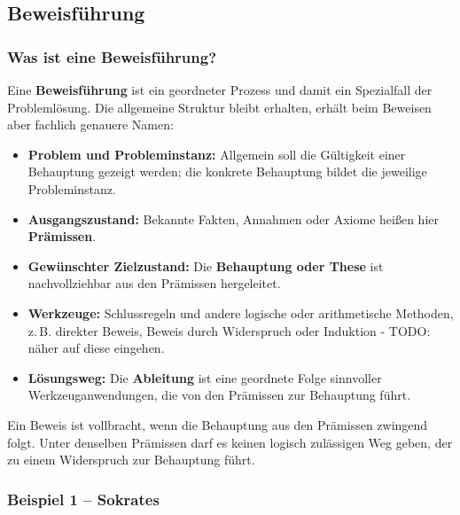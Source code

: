 \documentclass{article}
\begin{document}
  
  
    
      \subsection{Beweisführung}
    
      \subsubsection{Was ist eine Beweisführung?}
      

        Eine \textbf{Beweisführung} ist ein geordneter Prozess und damit ein Spezialfall der Problemlösung. Die allgemeine Struktur bleibt erhalten, erhält beim Beweisen aber fachlich genauere Namen:
      

      \begin{itemize}
        \item \textbf{Problem und Probleminstanz:} Allgemein soll die Gültigkeit einer Behauptung gezeigt werden; die konkrete Behauptung bildet die jeweilige Probleminstanz.

        \item \textbf{Ausgangszustand:} Bekannte Fakten, Annahmen oder Axiome heißen hier \textbf{Prämissen}.

        \item \textbf{Gewünschter Zielzustand:} Die \textbf{Behauptung oder These} ist nachvollziehbar aus den Prämissen hergeleitet.

        \item \textbf{Werkzeuge:} Schlussregeln und andere logische oder arithmetische Methoden, z.\,B. direkter Beweis, Beweis durch Widerspruch oder Induktion - TODO: näher auf diese eingehen.

        \item \textbf{Lösungsweg:} Die \textbf{Ableitung} ist eine geordnete Folge sinnvoller Werkzeuganwendungen, die von den Prämissen zur Behauptung führt.

      \end{itemize}

      Ein Beweis ist vollbracht, wenn die Behauptung aus den Prämissen zwingend folgt. Unter denselben Prämissen darf es keinen logisch zulässigen Weg geben, der zu einem Widerspruch zur Behauptung führt.

      \subsubsection{Beispiel 1 – Sokrates}
      
\end{document}
